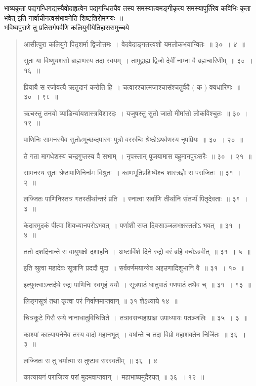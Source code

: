 \documentclass[11pt, openany]{book}
\begin{document}
\newpage

{\qt भाष्यकृता पद्यगन्धिगद्यस्यैवोदाहृत्वेन पद्यगन्धितयैव तस्य समस्यात्वमङ्गीकृत्य समस्यापूर्तिरेव कविभिः कृता भवेत् इति नार्वाचीनत्वसंभावनेति} शिष्टशिरोमणयः~॥\\

भविष्यपुराणे तु प्रतिसर्गपर्वणि कलियुगीयेतिहाससमुच्चये \textendash\ 

\begin{quote}
{\qt आसीत्पुरा कलियुगे पितृशर्मा द्विजोत्तमः~। वेदवेदाङ्गतत्त्वशो यमलोकभयान्वितः~॥ ३०~। ४~॥ 

सुता या विष्णुयशसो ब्राह्मणस्य तदा स्वयम्~। तामुद्वाह्य द्विजो देवीं नाम्ना वै ब्रह्मचारिणीम्~॥ ३०~। १६~॥ 

प्रियायै स रजोवत्यै ऋतुदानं करोति हि~। चत्वारश्चात्मजाश्चासंश्चतुर्वदै ( क ) क्यधारिणः~॥ ३०~। ९८~॥

ऋचस्तु तनयो व्याडिर्न्यायशास्त्रविशारदः~। यजुषस्तु सुतो जातो मीमांसो लोकविश्चुतः~॥ ३०~। १९~॥

पाणिनिः सामनस्यैव सुतोsभूच्छब्दपारगः पुत्रो वररुचिः श्रेष्ठोऽथर्वणस्य नृपप्रियः~॥ ३०~। २०~॥

ते गता मागधेशस्य चन्द्रगुप्तस्य वै सभाम्~। नृपस्तान् पूजयामास बहुमानपुरःसरैः~॥ ३०~। २१~॥

सामनस्य सुतः श्रेष्ठःपाणिनिर्नाम विश्रुतः~। काणभूतिप्रशिष्यैश्च शास्त्रज्ञैः स पराजितः~॥ ३१~। २~॥

लज्जितः पाणिनिस्तत्र गतस्तीर्थान्तरं प्रति~। स्नात्वा सर्वाणि तीर्थानि संतर्प्यं पितृदेवताः~॥ ३१~। ३~॥

केदारमुदकं पीत्वा शिवध्यानपरोऽभवत्~। पर्णाशी सप्त दिवसाञ्जलभक्षस्ततोऽ भवत्~॥ ३१~। ४~॥

ततो दशदिनान्ते स वायुभक्षो दशाहनि~। अष्टाविंशे दिने रुद्रो वरं ब्रहि वचोऽब्रवीत्~॥ ३१~। ५~॥

इति श्रुत्वा महादेवः सूत्राणि प्रददौ मुदा~। सर्ववर्णमयान्येव अइउणादिशुभानि वै~॥ ३१~। १०~॥

इत्युक्त्वाऽन्तर्दथे रुद्रः पाणिनिः स्वगृहं ययौ~। सूत्रपाठं धातुपाठं गणपाठं तथैव च्~॥ ३१~। १३~॥

लिङ्गसूत्रं तथा कृत्वा परं निर्वाणमाप्तवान्~॥ ३१ शेऽध्याये १४~॥ 

चित्रकूटे गिरौ रम्ये नानाधातुविचित्रिते~। तत्रावसन्महाप्राज्ञ उपाध्यायः पतञ्जलिः~॥ ३५~। ३~॥

काश्यां कात्यायनेनैव तस्य वादो महानभूत्~। वर्षान्ते च तदा विप्रो महाशक्तेन निर्जितः~॥ ३६~। ३~॥

लज्जितः स तु धर्मात्मा स तुष्टाव सरस्वतीम्~॥ ३६~। ४

कात्यायनं पराजित्य परां मुदमवाप्तवान्~। {\qt महाभाष्यमुदैरयत्~॥ ३६~। १२~॥}}
\end{quote}
\end{document}
